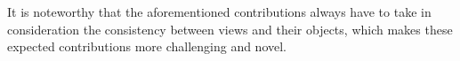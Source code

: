 It is noteworthy that the aforementioned contributions always have to take in consideration the consistency between views and their objects, which makes these expected contributions more challenging and novel.



%
%
